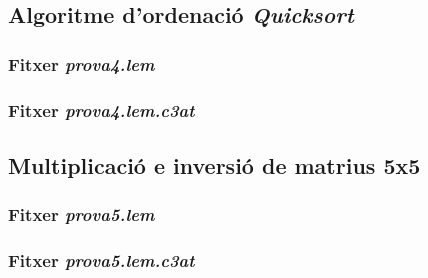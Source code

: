 \subsection{Algoritme d'ordenació \emph{Quicksort}}
\subsubsection{Fitxer \emph{prova4.lem}}

\newpage
\subsubsection{Fitxer \emph{prova4.lem.c3at}}

\newpage

\subsection{Multiplicació e inversió de matrius 5x5}
\subsubsection{Fitxer \emph{prova5.lem}}

\newpage
\subsubsection{Fitxer \emph{prova5.lem.c3at}}

\newpage
